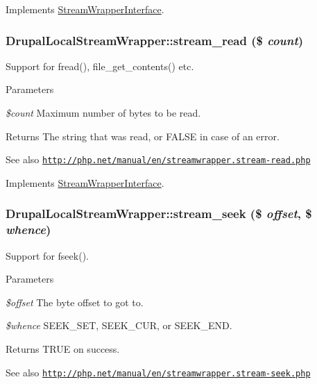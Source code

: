 Implements \hyperlink{interfaceStreamWrapperInterface}{StreamWrapperInterface}.\hypertarget{classDrupalLocalStreamWrapper_aa9d440c0bde94aa2ba1dcff6e5f54f31}{
\subsubsection[{stream\_\-read}]{\setlength{\rightskip}{0pt plus 5cm}DrupalLocalStreamWrapper::stream\_\-read (\$ {\em count})}}
\label{classDrupalLocalStreamWrapper_aa9d440c0bde94aa2ba1dcff6e5f54f31}
Support for fread(), file\_\-get\_\-contents() etc.


\begin{DoxyParams}{Parameters}
\item[{\em \$count}]Maximum number of bytes to be read.\end{DoxyParams}
\begin{DoxyReturn}{Returns}
The string that was read, or FALSE in case of an error.
\end{DoxyReturn}
\begin{DoxySeeAlso}{See also}
\href{http://php.net/manual/en/streamwrapper.stream-read.php}{\tt http://php.net/manual/en/streamwrapper.stream-\/read.php} 
\end{DoxySeeAlso}


Implements \hyperlink{interfaceStreamWrapperInterface}{StreamWrapperInterface}.\hypertarget{classDrupalLocalStreamWrapper_a3e1029b8c14d53557dc0c241a804662d}{
\subsubsection[{stream\_\-seek}]{\setlength{\rightskip}{0pt plus 5cm}DrupalLocalStreamWrapper::stream\_\-seek (\$ {\em offset}, \/  \$ {\em whence})}}
\label{classDrupalLocalStreamWrapper_a3e1029b8c14d53557dc0c241a804662d}
Support for fseek().


\begin{DoxyParams}{Parameters}
\item[{\em \$offset}]The byte offset to got to. \item[{\em \$whence}]SEEK\_\-SET, SEEK\_\-CUR, or SEEK\_\-END.\end{DoxyParams}
\begin{DoxyReturn}{Returns}
TRUE on success.
\end{DoxyReturn}
\begin{DoxySeeAlso}{See also}
\href{http://php.net/manual/en/streamwrapper.stream-seek.php}{\tt http://php.net/manual/en/streamwrapper.stream-\/seek.php} 
\end{DoxySeeAlso}


